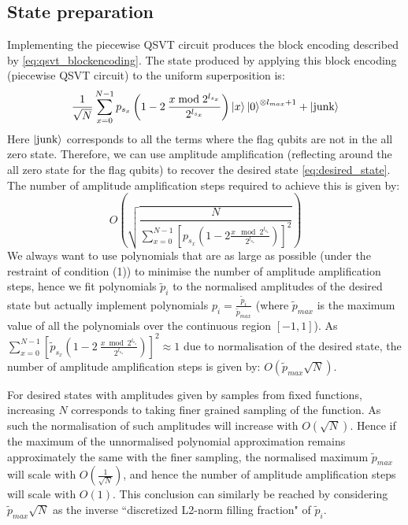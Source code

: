 \documentclass[aps,prx,twocolumn,floatfix,10pt,amssymb,amsfont,amsmath,superscriptaddress,float,nofootinbib,longbibliography,nobalancelastpage]{revtex4-2}
\theoremstyle{empty}
\begin{document}
\subsection{State preparation}
\label{section:state_prep}
Implementing the piecewise QSVT circuit produces the block encoding described by \eqref{eq:qsvt_blockencoding}. The state produced by applying this block encoding (piecewise QSVT circuit) to the uniform superposition is: 
\begin{equation}
    \frac{1}{\sqrt{N}}\sum_{x=0}^{N-1} p_{s_x}\left( 1 - 2\>\frac{x \bmod 2^{l_{s_x}}}{2^{l_{s_x}}}\right)  \ket{x}\ket{0}^{\otimes l_{max}+1} + \ket{\text{junk}}
\end{equation}
Here $\ket{\text{junk}}$ corresponds to all the terms where the flag qubits are not in the all zero state. Therefore, we can use amplitude amplification (reflecting around the all zero state for the flag qubits) to recover the desired state \eqref{eq:desired_state}. The number of amplitude amplification steps required to achieve this is given by:
\begin{equation}
    O\left(\sqrt{\frac{N}{\sum_{x=0}^{N-1} \left[p_{s_x}\left( 1 - 2\frac{x \mod 2^{l_{s_x}}}{2^{l_{s_x}}}\right)\right]^2}}\right)
\end{equation}
We always want to use polynomials that are as large as possible (under the restraint of condition (1)) to minimise the number of amplitude amplification steps, hence we fit polynomials $\tilde p_i$ to the normalised amplitudes of the desired state but actually implement polynomials $p_i = \frac{\tilde p_i}{\tilde p_{max}}$ (where $\tilde{p}_{max}$ is the maximum value of all the polynomials over the continuous region $[-1,1]$). As $\sum_{x=0}^{N-1} \left[ \tilde{p}_{s_x}\left( 1 - 2\>\frac{x \bmod 2^{l_{s_x}}}{2^{l_{s_x}}}\right)\right]^2 \approx 1$ due to normalisation of the desired state, the number of amplitude amplification steps is given by: $O(\tilde{p}_{max}\sqrt{N})$. 

For desired states with amplitudes given by samples from fixed functions, increasing $N$ corresponds to taking finer grained sampling of the function. As such the normalisation of such amplitudes will increase with $O(\sqrt{N})$. Hence if the maximum of the unnormalised polynomial approximation remains approximately the same with the finer sampling, the normalised maximum $\tilde{p}_{max}$ will scale with $O(\frac{1}{\sqrt{N}})$, and hence the number of amplitude amplification steps will scale with $O(1)$. This conclusion can similarly be reached by considering $\tilde{p}_{max} \sqrt{N}$ as the inverse ``discretized L2-norm filling fraction" of $\tilde{p}_i$.
\end{document}
